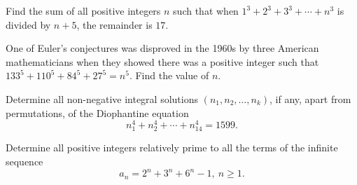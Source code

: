 \documentclass[mast]{lucky}
\begin{document}
\begin{prob}[AOIME 2020/10]{6}
Find the sum of all positive integers $n$ such that when $1^3+2^3+3^3+\cdots+n^3$ is divided by $n+5$, the remainder is $17.$
\end{prob}

\begin{req}[AIME 1989/9]{9}
One of Euler's conjectures was disproved in the 1960s by three American mathematicians when they showed there was a positive integer such that $133^5+110^5+84^5+27^5=n^{5}$. Find the value of $n$.
\end{req}
    
\begin{prob}[USAMO 1979/1]{9}
Determine all non-negative integral solutions $(n_1, n_2, \dots , n_k)$, if any, apart from permutations, of the Diophantine equation
$$n_1^4 + n_2^4 + \cdots + n_{14}^{4} = 1599.$$
\end{prob}

\begin{prob}[IMO 2005/4]{13}
Determine all positive integers relatively prime to all the terms of the infinite sequence
\[a_n=2^n+3^n+6^n -1,\ n\geq 1.\]
\end{prob}
\end{document}
